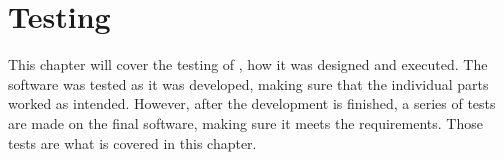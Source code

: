 \chapter{Testing}
This chapter will cover the testing of \projectname{}, how it was designed and executed. 
The software was tested as it was developed, making sure that the individual parts worked as intended.
However, after the development is finished, a series of tests are made on the final software, making sure it meets the requirements. 
Those tests are what is covered in this chapter. 




